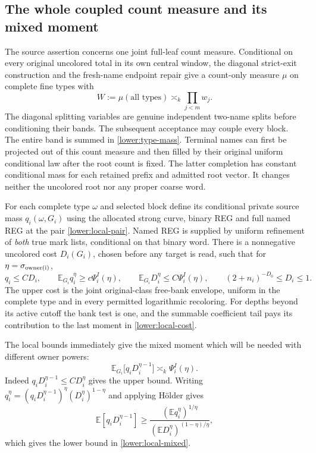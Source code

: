 \subsection{The whole coupled count measure and its mixed moment}
\label{lower:source-moment}
The source assertion concerns one joint full-leaf count measure.
Conditional on every original uncolored total in its own central window, the diagonal strict-exit construction and the
fresh-name endpoint repair give a count-only measure $\mu$ on complete
fine types with
\begin{equation}
 W:=\mu(\text{all types})\asymp_k\prod_{j<m}w_j.
 \label{lower:type-mass}
\end{equation}
The diagonal splitting variables are genuine independent two-name
splits before conditioning their bands.  The subsequent acceptance
may couple every block.  The entire band is summed in
\eqref{lower:type-mass}.
Terminal names can first be projected out of this count measure and
then filled by their original uniform conditional law after the root
count is fixed.  The latter completion has constant conditional mass
for each retained prefix and admitted root vector.  It changes neither
the uncolored root nor any proper coarse word.

For each complete type $\omega$ and selected block define its
conditional private source mass $q_i(\omega,G_i)$ using the allocated
strong curve, binary REG and full named REG at the pair
\eqref{lower:local-pair}.  Named REG is supplied by uniform refinement
of \emph{both} true mark lists, conditional on that binary word.
There is a nonnegative uncolored cost $D_i(G_i)$, chosen before any
target is read, such that for $\eta=\sigma_{\rm owner(i)}$,
\begin{equation}
 q_i\leq C D_i,\qquad
 \mathbb E_{G_i}q_i^{\eta}\geq c\Psi_i^I(\eta),\qquad
 \mathbb E_{G_i}D_i^{\eta}\leq C\Psi_i^I(\eta),\qquad
 (2+n_i)^{-D_0}\leq D_i\leq1.
 \label{lower:local-cost}
\end{equation}
The upper cost is the joint original-class free-bank envelope, uniform
in the complete type and in every permitted logarithmic recoloring.
For depths beyond its active cutoff the bank test is one, and the
summable coefficient tail pays its contribution to the last moment
in \eqref{lower:local-cost}.

The local bounds immediately give the mixed moment which will be
needed with different owner powers:
\begin{equation}
 \mathbb E_{G_i}\big[q_iD_i^{\eta-1}\big]
                  \asymp_k\Psi_i^I(\eta).
 \label{lower:local-mixed}
\end{equation}
Indeed $q_iD_i^{\eta-1}\leq C D_i^\eta$ gives the upper bound.
Writing $q_i^\eta=(q_iD_i^{\eta-1})^\eta
(D_i^\eta)^{1-\eta}$ and applying H\"older gives
\[
 \mathbb E[q_iD_i^{\eta-1}]
 \geq \frac{(\mathbb E q_i^\eta)^{1/\eta}}
 { (\mathbb E D_i^\eta)^{(1-\eta)/\eta}},
\]
which gives the lower bound in \eqref{lower:local-mixed}.

